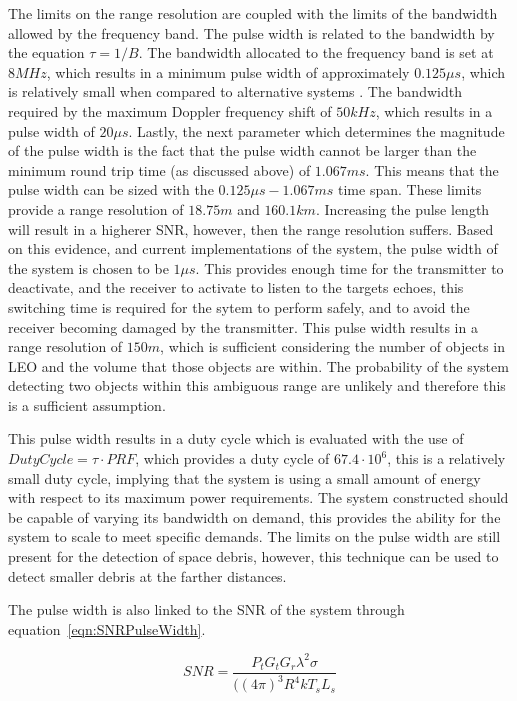 \documentclass[11pt]{witseiepaper}
\begin{document}
The limits on the range resolution are coupled with the limits of the bandwidth allowed by the frequency band. The pulse width is related to the bandwidth by the equation $\tau = 1/ B$.
The bandwidth allocated to the frequency band is set at $8 MHz$, which results in a minimum pulse width of approximately $0.125 \mu s$, which is relatively small when compared to alternative systems \cite{AMISR, EISCAT, SIMO, telescope, BeamForming, OrbitDetermination, PlanarArray}. The bandwidth required by the maximum Doppler frequency shift of $50 kHz$, which results in a pulse width of $20 \mu s$.
Lastly, the next parameter which determines the magnitude of the pulse width is the fact that the pulse width cannot be larger than the minimum round trip time (as discussed above) of $1.067 ms$. 
This means that the pulse width can be sized with the $0.125 \mu s - 1.067 ms$ time span.
These limits provide a range resolution of $18.75 m$ and $160.1 km$. Increasing the pulse length will result in a higherer SNR, however, then the range resolution suffers.
Based on this evidence, and current implementations of the system, the pulse width of the system is chosen to be $1 \mu s$. This provides enough time for the transmitter to deactivate, and the receiver to activate to listen to the targets echoes, this switching time is required for the sytem to perform safely, and to avoid the receiver becoming damaged by the transmitter.
This pulse width results in a range resolution of $150 m$, which is sufficient considering the number of objects in LEO and the volume that those objects are within. The probability of the system detecting two objects within this ambiguous range are unlikely and therefore this is a sufficient assumption.

This pulse width results in a duty cycle which is evaluated with the use of $Duty Cycle = \tau \cdot PRF$, which provides a duty cycle of $67.4 \cdot 10^{6}$, this is a relatively small duty cycle, implying that the system is using a small amount of energy with respect to its maximum power requirements.
The system constructed should be capable of varying its bandwidth on demand, this provides the ability for the system to scale to meet specific demands. The limits on the pulse width are still present for the detection of space debris, however, this technique can be used to detect smaller debris at the farther distances.

The pulse width is also linked to the SNR of the system through equation~\ref{eqn:SNRPulseWidth}.

\begin{equation} \label{eqn:SNRPulseWidth}
SNR = \frac{P_{t} G_t G_r {\lambda^2} \sigma}{((4 \pi )^3 R^4 k T_s L_s}
\end{equation}
\end{document}
